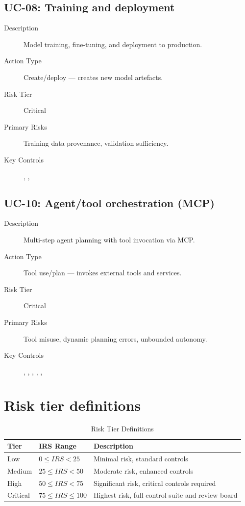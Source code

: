\subsection{UC-08: Training and deployment}

\begin{description}
  \item[Description] Model training, fine-tuning, and deployment to production.
  \item[Action Type] Create/deploy --- creates new model artefacts.
  \item[Risk Tier] Critical
  \item[Primary Risks] Training data provenance, validation sufficiency.
  \item[Key Controls] , , 
\end{description}

\subsection{UC-10: Agent/tool orchestration (MCP)}

\begin{description}
  \item[Description] Multi-step agent planning with tool invocation via MCP.
  \item[Action Type] Tool use/plan --- invokes external tools and services.
  \item[Risk Tier] Critical
  \item[Primary Risks] Tool misuse, dynamic planning errors, unbounded autonomy.
  \item[Key Controls] , , ,
        , , 
\end{description}

\section{Risk tier definitions}

\begin{table}[htbp]
\centering
\caption{Risk Tier Definitions}
\begin{tabularx}{\textwidth}{@{}l l X@{}}
\toprule
\textbf{Tier} & \textbf{IRS Range} & \textbf{Description} \\
\midrule
Low & $0 \leq IRS < 25$ & Minimal risk, standard controls \\
Medium & $25 \leq IRS < 50$ & Moderate risk, enhanced controls \\
High & $50 \leq IRS < 75$ & Significant risk, critical controls required \\
Critical & $75 \leq IRS \leq 100$ & Highest risk, full control suite and review board \\
\bottomrule
\end{tabularx}
\end{table}

